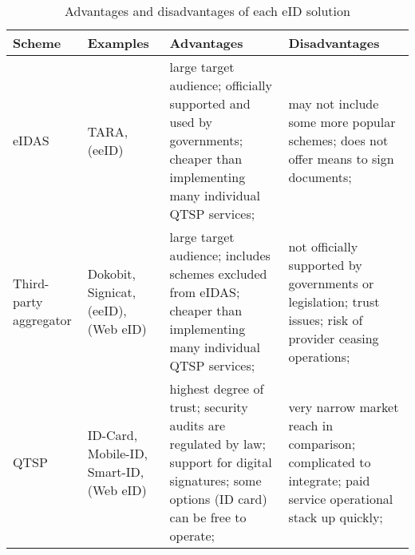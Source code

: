 \begin{table}[h]
    \centering
    \caption{Advantages and disadvantages of each eID solution}
    \begin{tabular}{p{2cm} | p{2cm} | p{4.4cm} | p{4.4cm}}
        \bf{Scheme}            & \bf{Examples}                           & \bf{Advantages}                                                                                                                                                          & \bf{Disadvantages}                                                                                                             \\
        \hline
        eIDAS                  & TARA, (eeID)                            & large target audience; \newline officially supported and used by governments; \newline cheaper than implementing many individual QTSP services;                          & may not include some more popular schemes; \newline does not offer means to sign documents;                                    \\
        \hline
        Third-party aggregator & Dokobit, Signicat, (eeID), (Web eID)    & large target audience; \newline includes schemes excluded from eIDAS; \newline cheaper than implementing many individual QTSP services;                                  & not officially supported by governments or legislation; \newline trust issues; \newline risk of provider ceasing operations;   \\
        \hline
        QTSP                   & ID-Card, Mobile-ID, Smart-ID, (Web eID) & highest degree of trust; \newline security audits are regulated by law; \newline support for digital signatures; \newline some options (ID card) can be free to operate; & very narrow market reach in comparison; \newline complicated to integrate; \newline paid service operational stack up quickly; \\
    \end{tabular}
    \label{tab:eid-advantages-disadvantages}
\end{table}

